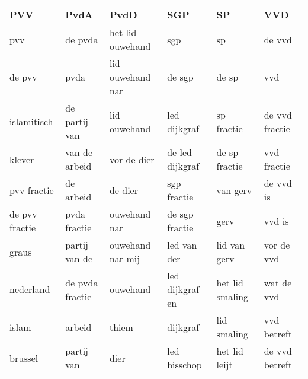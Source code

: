 \begin{tabular}{llllll}
\toprule
            PVV &             PvdA &              PvdD &              SGP &               SP &             VVD \\
\midrule
            pvv &          de pvda &  het lid ouwehand &              sgp &               sp &          de vvd \\
         de pvv &             pvda &  lid ouwehand nar &           de sgp &            de sp &             vvd \\
    islamitisch &    de partij van &      lid ouwehand &     led dijkgraf &       sp fractie &  de vvd fractie \\
         klever &    van de arbeid &       vor de dier &  de led dijkgraf &    de sp fractie &     vvd fractie \\
    pvv fractie &        de arbeid &           de dier &      sgp fractie &         van gerv &       de vvd is \\
 de pvv fractie &     pvda fractie &      ouwehand nar &   de sgp fractie &             gerv &          vvd is \\
          graus &    partij van de &  ouwehand nar mij &      led van der &     lid van gerv &      vor de vvd \\
      nederland &  de pvda fractie &          ouwehand &  led dijkgraf en &  het lid smaling &      wat de vvd \\
          islam &           arbeid &             thiem &         dijkgraf &      lid smaling &     vvd betreft \\
        brussel &       partij van &              dier &     led bisschop &    het lid leijt &  de vvd betreft \\
\bottomrule
\end{tabular}
